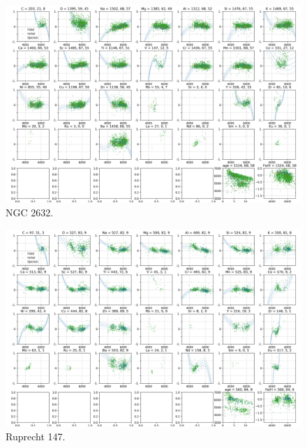 \begin{figure}
	\centering
	\includegraphics[width=\textwidth]{p_teff_abundances_NGC_2632_orbits_DR3_flag0.png}
	\caption{NGC 2632.}
	\label{fig:ct_cluster3}
\end{figure}

\begin{figure}
	\centering
	\includegraphics[width=\textwidth]{p_teff_abundances_Ruprecht_147_orbits_DR3_flag0.png}
	\caption{Ruprecht 147.}
	\label{fig:ct_cluster4}
\end{figure}